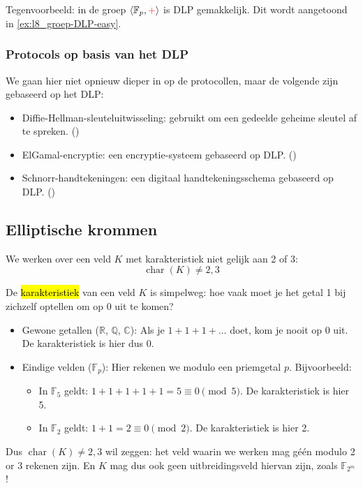 Tegenvoorbeeld: in de groep $\langle \mathbb{F}_p, \textcolor{Red}{+}\rangle$ is DLP gemakkelijk. Dit wordt aangetoond in \cref{ex:l8_groep-DLP-easy}.

\subsubsection*{Protocols op basis van het DLP}

We gaan hier niet opnieuw dieper in op de protocollen, maar de volgende zijn gebaseerd op het DLP:
\begin{itemize}
    \item Diffie-Hellman-sleuteluitwisseling: gebruikt om een gedeelde geheime sleutel af te spreken. ()
    \item ElGamal-encryptie: een encryptie-systeem gebaseerd op DLP. ()
    \item Schnorr-handtekeningen: een digitaal handtekeningsschema gebaseerd op DLP. ()
\end{itemize}

\subsection{Elliptische krommen}


We werken over een veld $K$ met karakteristiek niet gelijk aan 2 of 3:
\begin{equation*}
    \operatorname{char}(K) \neq 2, 3
\end{equation*}

 De \hl{karakteristiek} van een veld $K$ is simpelweg: hoe vaak moet je het getal 1 bij zichzelf optellen om op 0 uit te komen?
\begin{itemize}
    \item Gewone getallen ($\mathbb{R}$, $\mathbb{Q}$, $\mathbb{C}$): Als je $1 + 1 + 1 + \dots$ doet, kom je nooit op 0 uit. De karakteristiek is hier dus 0.
    \item Eindige velden ($\mathbb{F}_p$): Hier rekenen we modulo een priemgetal $p$. Bijvoorbeeld:
    \begin{itemize}
        \item In $\mathbb{F}_5$ geldt: $1 + 1 + 1 + 1 + 1 = 5 \equiv 0 \pmod 5$. De karakteristiek is hier 5.
        \item In $\mathbb{F}_2$ geldt: $1 + 1 = 2 \equiv 0 \pmod 2$. De karakteristiek is hier 2.
    \end{itemize}
\end{itemize}
Dus $\operatorname{char}(K) \neq 2,3$ wil zeggen: het veld waarin we werken mag géén modulo 2 or 3 rekenen zijn. En $K$ mag dus ook geen \textcolor{WildStrawberry}{uitbreidingsveld} hiervan zijn, zoals $\mathbb{F}_{2^m}$!

